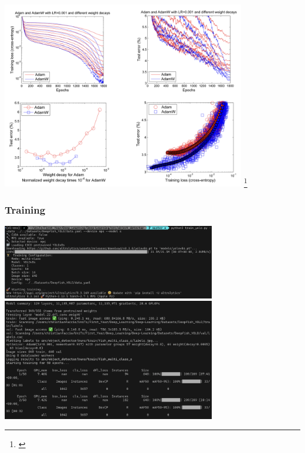\documentclass[serif]{beamer}  %
\begin{document}
\begin{frame}
    \centering
    \includegraphics[width=0.8\textwidth]{images/adamw_com.png}
    \footnote{\cite{loshchilov2019decoupledweightdecayregularization}}
\end{frame}

\begin{frame}
\frametitle{Training}
\centering
\includegraphics[width=0.7\textwidth]{images/training1.png}
\vspace{0.5cm}
\includegraphics[width=0.7\textwidth]{images/training2.png}
\end{frame}



{\tiny


}
\end{document}
